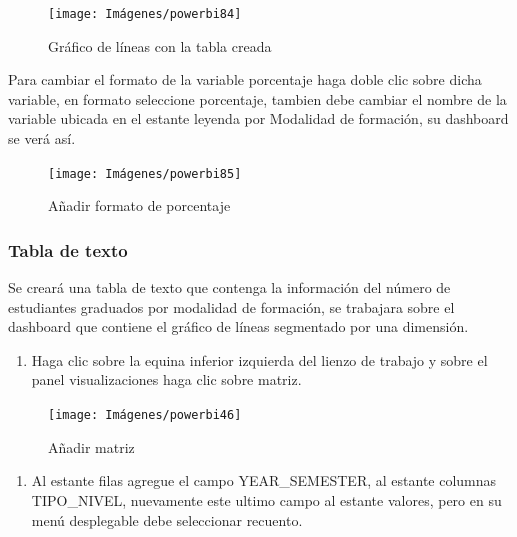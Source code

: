 \documentclass[
]{book}
\providecommand{\tightlist}{%
  \setlength{\itemsep}{0pt}\setlength{\parskip}{0pt}}
\begin{document}
\begin{figure}

{\centering \texttt{[image: Imágenes/powerbi84]} 

}

\caption{Gráfico de líneas con la tabla creada}\label{fig:reemplazarvariablescontablamodalidadformacion-fig}
\end{figure}

Para cambiar el formato de la variable porcentaje haga doble clic sobre dicha variable, en formato seleccione porcentaje, tambien debe cambiar el nombre de la variable ubicada en el estante leyenda por Modalidad de formación, su dashboard se verá así.

\begin{figure}

{\centering \texttt{[image: Imágenes/powerbi85]} 

}

\caption{Añadir formato de porcentaje}\label{fig:formatoporcentaje-fig}
\end{figure}

\hypertarget{tabladetextopowerbi}{%
\subsubsection{Tabla de texto}\label{tabladetextopowerbi}}

Se creará una tabla de texto que contenga la información del número de estudiantes graduados por modalidad de formación, se trabajara sobre el dashboard que contiene el gráfico de líneas segmentado por una dimensión.

\begin{enumerate}
\def\labelenumi{\arabic{enumi}.}
\tightlist
\item
  Haga clic sobre la equina inferior izquierda del lienzo de trabajo y sobre el panel visualizaciones haga clic sobre matriz.
\end{enumerate}

\begin{figure}

{\centering \texttt{[image: Imágenes/powerbi46]} 

}

\caption{Añadir matriz}\label{fig:paso1matriz-fig}
\end{figure}

\begin{enumerate}
\def\labelenumi{\arabic{enumi}.}
\setcounter{enumi}{1}
\tightlist
\item
  Al estante filas agregue el campo YEAR\_SEMESTER, al estante columnas TIPO\_NIVEL, nuevamente este ultimo campo al estante valores, pero en su menú desplegable debe seleccionar recuento.
\end{enumerate}
\end{document}
